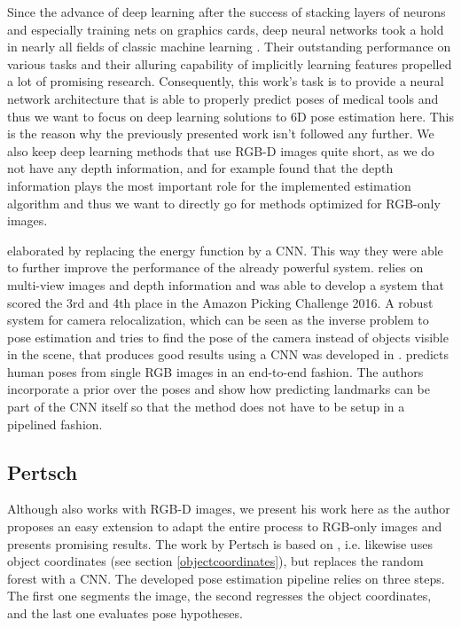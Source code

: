 Since the advance of deep learning after the success of stacking layers of neurons and especially training nets on graphics cards, deep neural networks took a hold in nearly all fields of classic machine learning \cite{ylecun}. Their outstanding performance on various tasks and their alluring capability of implicitly learning features propelled a lot of promising research. Consequently, this work's task is to provide a neural network architecture that is able to properly predict poses of medical tools and thus we want to focus on deep learning solutions to 6D pose estimation here. This is the reason why the previously presented work isn’t followed any further. We also keep deep learning methods that use RGB-D images quite short, as we do not have any depth information, and for example \cite{pertsch} found that the depth information plays the most important role for the implemented estimation algorithm and thus we want to directly go for methods optimized for RGB-only images.

\cite{akrull} elaborated \cite{brachmann1} by replacing the energy function by a CNN. This way they were able to further improve the performance of the already powerful system. \cite{azeng} relies on multi-view images and depth information and was able to develop a system that scored the 3rd and 4th place in the Amazon Picking Challenge 2016. A robust system for camera relocalization, which can be seen as the inverse problem to pose estimation and tries to find the pose of the camera instead of objects visible in the scene, that produces good results using a CNN was developed in \cite{posenet}. \cite{dtome} predicts human poses from single RGB images in an end-to-end fashion. The authors incorporate a prior over the poses and show how predicting landmarks can be part of the CNN itself so that the method does not have to be setup in a pipelined fashion.

\subsection{Pertsch}

Although \cite{pertsch} also works with RGB-D images, we present his work here as the author proposes an easy extension to adapt the entire process to RGB-only images and presents promising results. The work by Pertsch is based on \cite{brachmann1}, i.e. likewise uses object coordinates  (see section \ref{objectcoordinates}), but replaces the random forest with a CNN. The developed pose estimation pipeline relies on three steps. The first one segments the image, the second regresses the object coordinates, and the last one evaluates pose hypotheses. 

